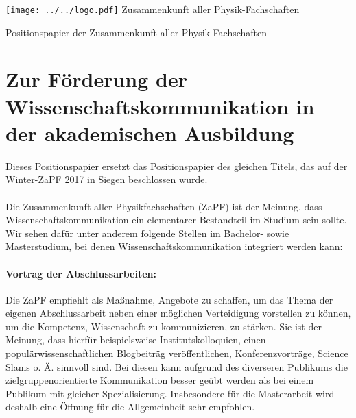 \documentclass[DIV=calc]{scrartcl}
\begin{document}
    \hspace{0.87\textwidth}
    \begin{minipage}{120pt}
        \vspace{-1.8cm}
        \texttt{[image: ../../logo.pdf]}
        \centering
        \small Zusammenkunft aller Physik-Fachschaften
    \end{minipage}
    \begin{center}
        \huge{Positionspapier der Zusammenkunft aller Physik-Fachschaften}\vspace{.25\baselineskip}\\
        \normalsize
    \end{center}
    \vspace{1cm}

\section*{Zur Förderung der Wissenschaftskommunikation in der akademischen Ausbildung}


Dieses Positionspapier ersetzt das Positionspapier des gleichen Titels, das auf der Winter-ZaPF 2017 in Siegen beschlossen wurde.\\~\\
Die Zusammenkunft aller Physikfachschaften (ZaPF) ist der Meinung, dass Wissenschaftskommunikation ein elementarer Bestandteil im Studium sein sollte. Wir sehen dafür unter anderem folgende Stellen im Bachelor- sowie Masterstudium, bei denen Wissenschaftskommunikation integriert werden kann:\\
\paragraph{Vortrag der Abschlussarbeiten:} Die ZaPF empfiehlt als Maßnahme, Angebote zu schaffen, um das Thema der eigenen Abschlussarbeit neben einer möglichen Verteidigung vorstellen zu können, um die Kompetenz, Wissenschaft zu kommunizieren, zu stärken. Sie ist der Meinung, dass hierfür beispielsweise Institutskolloquien, einen populärwissenschaftlichen Blogbeiträg veröffentlichen, Konferenzvorträge, Science Slams o. Ä. sinnvoll sind. Bei diesen kann aufgrund des diverseren Publikums die zielgruppenorientierte Kommunikation besser geübt werden als bei einem Publikum mit gleicher Spezialisierung. Insbesondere für die Masterarbeit wird deshalb eine Öffnung für die Allgemeinheit sehr empfohlen. 
\end{document}
